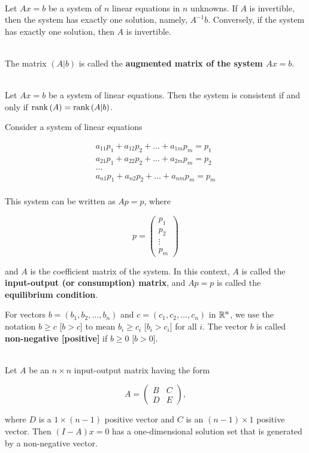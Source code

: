 \begin{theorem}
	\hfill\\
	Let $Ax = b$ be a system of $n$ linear equations in $n$ unknowns. If $A$ is invertible, then the system has exactly one solution, namely, $A^{-1}b$. Conversely, if the system has exactly one solution, then $A$ is invertible.
\end{theorem}

\begin{definition}
	\hfill\\
	The matrix $(A|b)$ is called the \textbf{augmented matrix of the system $Ax = b$}.
\end{definition}

\begin{theorem}
	\hfill\\
	Let $Ax = b$ be a system of linear equations. Then the system is consistent if and only if $\text{rank}\left(A\right) = \text{rank}\left(A|b\right)$.
\end{theorem}

\begin{definition}
	Consider a system of linear equations

	\[\begin{split}
			a_{11}p_1 + a_{12}p_2 + \dots + a_{1m}p_m = p_1 \\
			a_{21}p_1 + a_{22}p_2 + \dots + a_{2m}p_m = p_2 \\
			\dots \\
			a_{n1}p_1 + a_{n2}p_2 + \dots + a_{nm}p_m = p_m \\
		\end{split}\]

	This system can be written as $Ap = p$, where

	\[p = \begin{pmatrix}
			p_1 \\ p_2 \\ \vdots \\ p_m
		\end{pmatrix}\]

	and $A$ is the coefficient matrix of the system. In this context, $A$ is called the \textbf{input-output (or consumption) matrix}, and $Ap = p$ is called the \textbf{equilibrium condition}.

	For vectors $b = (b_1, b_2, \dots, b_n)$ and $c = (c_1, c_2, \dots, c_n)$ in $\mathbb{R}^n$, we use the notation $b \geq c$ [$b > c$] to mean $b_i \geq c_i$ [$b_i > c_i$] for all $i$. The vector $b$ is called \textbf{non-negative [positive]} if $b \geq 0$ [$b > 0$].
\end{definition}

\begin{theorem}
	\hfill\\
	Let $A$ be an $n \times n$ input-output matrix having the form

	\[A = \begin{pmatrix}
			B & C \\
			D & E
		\end{pmatrix},\]

	where $D$ is a $1 \times (n -1)$ positive vector and $C$ is an $(n-1)\times 1$ positive vector. Then $(I -A)x = 0$ has a one-dimensional solution set that is generated by a non-negative vector.
\end{theorem}
